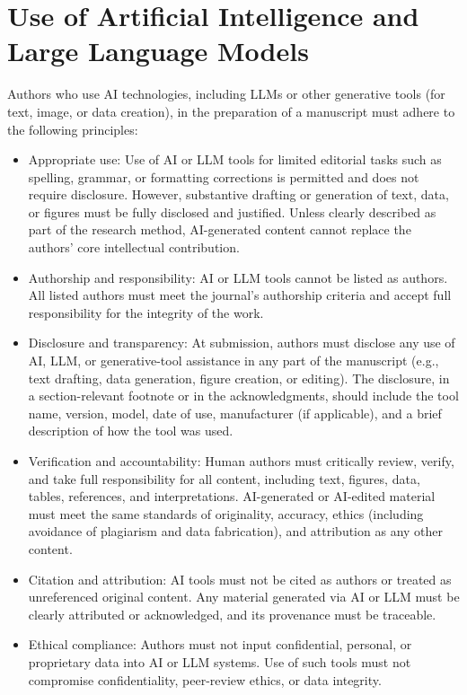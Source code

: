 \documentclass[fleqn]{jaes}
\begin{document}
\section{Use of Artificial Intelligence and Large Language Models}\label{sec:AI-LLM} 

Authors who use AI technologies, including LLMs or other generative tools (for text, image, or data creation), in the preparation of a manuscript must adhere to the following principles:

\begin{itemize}
  \item Appropriate use:
  Use of AI or LLM tools for limited editorial tasks such as spelling, grammar, or formatting corrections is permitted and does not require disclosure. However, substantive drafting or generation of text, data, or figures must be fully disclosed and justified.
  Unless clearly described as part of the research method, AI-generated content cannot replace the authors’ core intellectual contribution.
  
  \item Authorship and responsibility:
  AI or LLM tools cannot be listed as authors. All listed authors must meet the journal’s authorship criteria and accept full responsibility for the integrity of the work.
  
  \item Disclosure and transparency:
  At submission, authors must disclose any use of AI, LLM, or generative-tool assistance in any part of the manuscript (e.g., text drafting, data generation, figure creation, or editing). The disclosure, in a section-relevant footnote or in the acknowledgments, should include the tool name, version, model, date of use, manufacturer (if applicable), and a brief description of how the tool was used.

  \item Verification and accountability:
  Human authors must critically review, verify, and take full responsibility for all content, including text, figures, data, tables, references, and interpretations. AI-generated or AI-edited material must meet the same standards of originality, accuracy, ethics (including avoidance of plagiarism and data fabrication), and attribution as any other content.

  \item Citation and attribution:
  AI tools must not be cited as authors or treated as unreferenced original content.   Any material generated via AI or LLM must be clearly attributed or acknowledged, and its provenance must be traceable.

  \item Ethical compliance:
  Authors must not input confidential, personal, or proprietary data into AI or LLM systems.
  Use of such tools must not compromise confidentiality, peer-review ethics, or data integrity.
\end{itemize}
\end{document}
